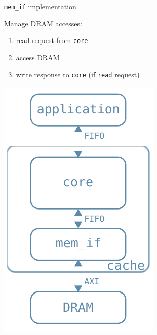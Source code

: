\documentclass{beamer}
\begin{document}
\begin{frame}{\texttt{mem\_if} implementation}
	\begin{minipage}{.7\textwidth}
		Manage DRAM accesses:
		\begin{enumerate}
			\item read request from \texttt{core}
			\item access DRAM
			\item write response to \texttt{core}
				(if \texttt{read} request)
		\end{enumerate}
	\end{minipage}
	\begin{minipage}{.29\textwidth}
		\begin{center}
			\includegraphics[width=.9\textwidth,height=.9\textheight,keepaspectratio]{internal_arch.pdf}
		\end{center}
	\end{minipage}
\end{frame}
\end{document}
